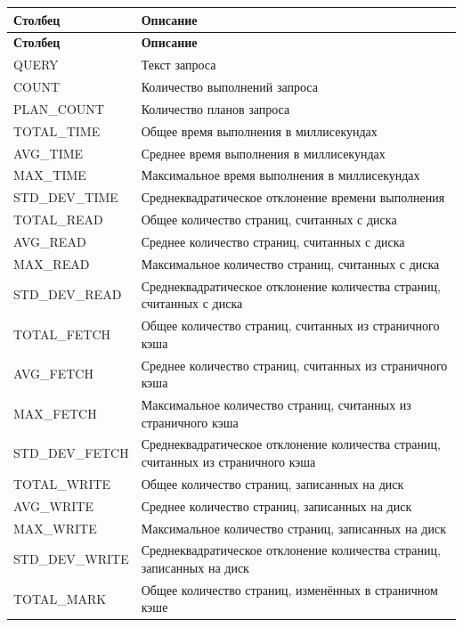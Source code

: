 \begin{longtable}[r]{|>{\ttfamily}m{4.6cm}|m{10.9cm}|}
	\hline
	\centering\normalfont\bfseries Столбец &
	\centering\arraybslash\bfseries Описание\\\hline
	\endfirsthead
	\centering\normalfont\bfseries Столбец &
	\centering\arraybslash\bfseries Описание\\\hline
	\endhead
	\hline
	QUERY & Текст запроса\\\hline
	COUNT & Количество выполнений запроса\\\hline
	PLAN\_COUNT & Количество планов запроса\\\hline
	TOTAL\_TIME & Общее время выполнения в миллисекундах\\\hline
	AVG\_TIME & Среднее время выполнения в миллисекундах\\\hline
	MAX\_TIME & Максимальное время выполнения в миллисекундах\\\hline
	STD\_DEV\_TIME & Среднеквадратическое отклонение времени выполнения\\\hline
	TOTAL\_READ & Общее количество страниц, считанных с диска\\\hline
	AVG\_READ & Среднее количество страниц, считанных с диска\\\hline
	MAX\_READ & Максимальное количество страниц, считанных с диска\\\hline
	STD\_DEV\_READ & Среднеквадратическое отклонение количества страниц, считанных с диска\\\hline
	TOTAL\_FETCH & Общее количество страниц, считанных из страничного кэша\\\hline
	AVG\_FETCH & Среднее количество страниц, считанных из страничного кэша\\\hline
	MAX\_FETCH & Максимальное количество страниц, считанных из страничного кэша\\\hline
	STD\_DEV\_FETCH & Среднеквадратическое отклонение количества страниц, считанных из страничного кэша\\\hline
	TOTAL\_WRITE & Общее количество страниц, записанных на диск\\\hline
	AVG\_WRITE & Среднее количество страниц, записанных на диск\\\hline
	MAX\_WRITE & Максимальное количество страниц, записанных на диск\\\hline
	STD\_DEV\_WRITE & Среднеквадратическое отклонение количества страниц, записанных на диск\\\hline
	TOTAL\_MARK & Общее количество страниц, изменённых в страничном кэше\\\hline

\end{longtable}
